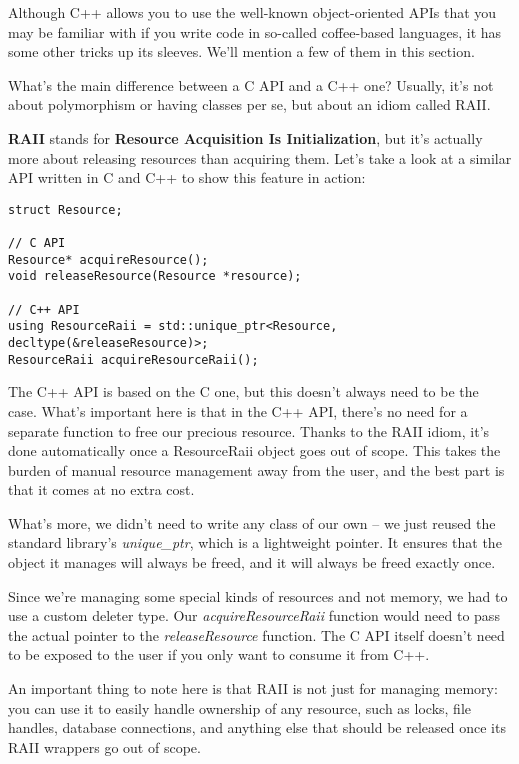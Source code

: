
Although C++ allows you to use the well-known object-oriented APIs that you may be familiar with if you write code in so-called coffee-based languages, it has some other tricks up its sleeves. We'll mention a few of them in this section.



What's the main difference between a C API and a C++ one? Usually, it's not about polymorphism or having classes per se, but about an idiom called RAII.

\textbf{RAII} stands for \textbf{Resource Acquisition Is Initialization}, but it's actually more about releasing resources than acquiring them. Let's take a look at a similar API written in C and C++ to show this feature in action:


\begin{lstlisting}[style=styleCXX]
struct Resource;

// C API
Resource* acquireResource();
void releaseResource(Resource *resource);

// C++ API
using ResourceRaii = std::unique_ptr<Resource, decltype(&releaseResource)>;
ResourceRaii acquireResourceRaii();

\end{lstlisting}

The C++ API is based on the C one, but this doesn't always need to be the case. What's important here is that in the C++ API, there's no need for a separate function to free our precious resource. Thanks to the RAII idiom, it's done automatically once a ResourceRaii object goes out of scope. This takes the burden of manual resource management away from the user, and the best part is that it comes at no extra cost.

What's more, we didn't need to write any class of our own – we just reused the standard library's \textit{unique\_ptr}, which is a lightweight pointer. It ensures that the object it manages will always be freed, and it will always be freed exactly once.

Since we're managing some special kinds of resources and not memory, we had to use a custom deleter type. Our \textit{acquireResourceRaii} function would need to pass the actual pointer to the \textit{releaseResource} function. The C API itself doesn't need to be exposed to the user if you only want to consume it from C++.

An important thing to note here is that RAII is not just for managing memory: you can use it to easily handle ownership of any resource, such as locks, file handles, database connections, and anything else that should be released once its RAII wrappers go out of scope.

